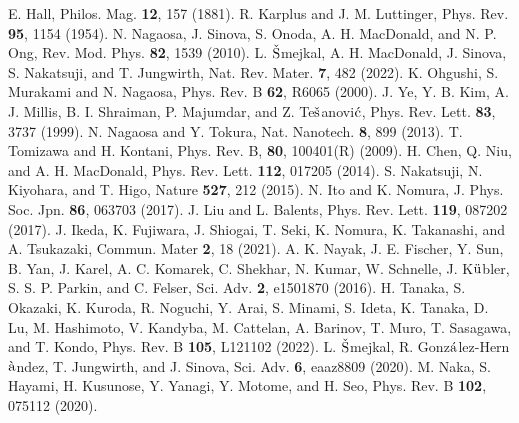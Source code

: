 \documentclass[aps,twocolumn,prb,preprintnumbers,amsmath,amssymb]{revtex4-2}
\begin{document}
\begin{thebibliography}{99}
%
E. Hall, 
Philos. Mag. {\bf 12}, 157 (1881).
%
R. Karplus and J. M. Luttinger, 
Phys. Rev. {\bf 95}, 1154 (1954). 
%
N. Nagaosa, J. Sinova, S. Onoda, A. H. MacDonald, and N. P. Ong, 
Rev. Mod. Phys. {\bf 82}, 1539 (2010).
%
L. $\check{\rm S}$mejkal, A. H. MacDonald, J. Sinova, S. Nakatsuji, and T. Jungwirth, 
Nat. Rev. Mater. {\bf 7}, 482 (2022). 
%
K. Ohgushi, S. Murakami and N. Nagaosa, 
Phys. Rev. B {\bf 62}, R6065 (2000).
%
J. Ye, Y. B. Kim, A. J. Millis, B. I. Shraiman, P. Majumdar, and Z. Te$\check{\rm s}$anovi$\acute{\rm c}$, 
Phys. Rev. Lett. {\bf 83}, 3737 (1999).
%
N. Nagaosa and Y. Tokura, 
Nat. Nanotech. {\bf 8}, 899 (2013). 
%
T. Tomizawa and H. Kontani, 
Phys. Rev. B, {\bf 80}, 100401(R) (2009). 
%
H. Chen, Q. Niu, and A. H. MacDonald, 
Phys. Rev. Lett. {\bf 112}, 017205 (2014).
%
S. Nakatsuji, N. Kiyohara, and T. Higo, 
Nature {\bf 527}, 212 (2015).
%
N. Ito and K. Nomura, 
J. Phys. Soc. Jpn. {\bf 86}, 063703 (2017).
%
J. Liu and L. Balents, 
Phys. Rev. Lett. {\bf 119}, 087202 (2017).
%
J. Ikeda, K. Fujiwara, J. Shiogai, T. Seki, K. Nomura, K. Takanashi, and A. Tsukazaki, 
Commun. Mater {\bf 2}, 18 (2021).
%
A. K. Nayak, J. E. Fischer, Y. Sun, B. Yan, J. Karel, A. C. Komarek, C. Shekhar, N. Kumar, W. Schnelle, J. K$\ddot{{\rm u}}$bler, S. S. P. Parkin, and C. Felser,  Sci. Adv. {\bf 2}, e1501870 (2016).
%
H. Tanaka, S. Okazaki, K. Kuroda, R. Noguchi, Y. Arai, S. Minami, S. Ideta, K. Tanaka, D. Lu, M. Hashimoto, V. Kandyba, M. Cattelan, A. Barinov, T. Muro, T. Sasagawa, and T. Kondo, 
Phys. Rev. B {\bf 105}, L121102 (2022).
%
L. $\check{\rm S}$mejkal, R. Gonz$\acute{\rm a}$lez-Hern$\grave{\rm a}$ndez, T. Jungwirth, and J. Sinova, 
Sci. Adv. {\bf 6}, eaaz8809 (2020).
%
%
%
M. Naka, S. Hayami, H. Kusunose, Y. Yanagi, Y. Motome, and H. Seo, 
Phys. Rev. B {\bf 102}, 075112 (2020).

\end{thebibliography}
\end{document}
